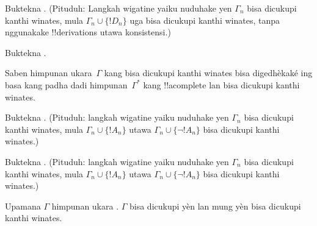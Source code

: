 \documentclass[../../../include/open-logic-section]{subfiles}
\begin{document}
\begin{prob}
Buktekna . (Pituduh: Langkah
wigatine yaiku nuduhake yen $\Gamma_n$ bisa dicukupi kanthi winates,
mula $\Gamma_n \cup \{!D_n\}$ uga bisa dicukupi kanthi winates, tanpa
nggunakake !!{derivation}s utawa konsistensi.)
\end{prob}
\tagendprob


\begin{prob}
Buktekna .
\end{prob}
\tagendprob

\begin{lem}
 Saben himpunan ukara~$\Gamma$
kang bisa dicukupi kanthi winates
bisa digedhèkaké ing basa kang padha dadi himpunan~$\Gamma^*$
kang !!a{complete} lan bisa dicukupi kanthi winates.
\end{lem}

\begin{prob}
Buktekna . (Pituduh: langkah
wigatine yaiku nuduhake yen $\Gamma_n$ bisa dicukupi kanthi winates,
mula $\Gamma_n \cup \{!A_n\}$ utawa $\Gamma_n \cup \{\lnot !A_n\}$
bisa dicukupi kanthi winates.)
\end{prob}
\tagendprob

\begin{prob}
Buktekna . (Pituduh: langkah
wigatine yaiku nuduhake yen $\Gamma_n$ bisa dicukupi kanthi winates,
mula $\Gamma_n \cup \{!A_n\}$ utawa $\Gamma_n \cup \{\lnot !A_n\}$
bisa dicukupi kanthi winates.)
\end{prob}
\tagendprob

\begin{thm}[Kekompakan]
 Upamana $\Gamma$ himpunan ukara
. $\Gamma$ bisa dicukupi
yèn lan mung yèn bisa dicukupi kanthi winates.
\end{thm}
\end{document}

